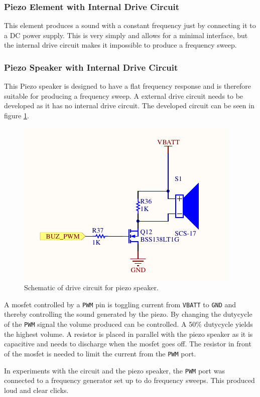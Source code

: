 \subsubsection*{Piezo Element with Internal Drive Circuit}
This element produces a sound with a constant frequency just by connecting it to a DC power supply. 
This is very simply and allows for a minimal interface, but the internal drive circuit makes it impossible to produce a frequency sweep. 

\subsubsection*{Piezo Speaker with Internal Drive Circuit}
This Piezo speaker is designed to have a flat frequency response and is therefore suitable for producing a frequency sweep. 
A external drive circuit needs to be developed as it has no internal drive circuit.
The developed circuit can be seen in figure \ref{fig:buzzer_circuit}.

\begin{figure}[h]
	\centering
	\includegraphics[width=.6\linewidth]{graphics/buzzer_circuit.pdf}
	\caption{Schematic of drive circuit for piezo speaker.}
	\label{fig:buzzer_circuit}
\end{figure}

A mosfet controlled by a \texttt{PWM} pin is toggling current from \texttt{VBATT} to \texttt{GND} and thereby controlling the sound generated by the piezo.
By changing the dutycycle of the \texttt{PWM} signal the volume produced can be controlled. 
A 50\% dutycycle yields the highest volume. 
A resistor is placed in parallel with the piezo speaker as it is capacitive and needs to discharge when the mosfet goes off.
The resistor in front of the mosfet is needed to limit the current from the \texttt{PWM} port. 

In experiments with the circuit and the piezo speaker, the \texttt{PWM} port was connected to a frequency generator set up to do frequency sweeps.
This produced loud and clear clicks.

